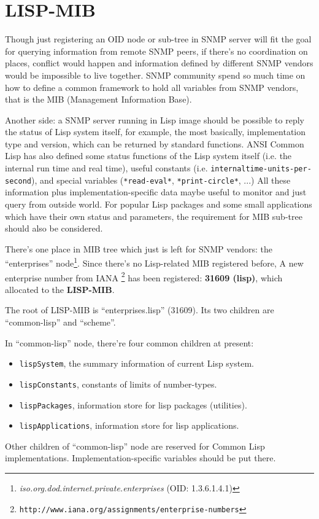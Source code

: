 \documentclass[reprint,natbib,9pt]{sigplanconf}
\begin{document}
\section{LISP-MIB}

Though just registering an OID node or sub-tree in SNMP server will
fit the goal for querying information from remote SNMP peers, if there's
no coordination on places, conflict would happen and information
defined by different SNMP vendors would be impossible to live
together. SNMP community spend so much time on how to define a common
framework to hold all variables from SNMP
vendors, that is the MIB (Management Information Base)\cite{RFC:3418}.

Another side: a SNMP server running in Lisp image should be possible
to reply the status of Lisp system itself, for example, the most
basically, implementation type and version, which can be returned by
standard functions. ANSI Common Lisp has also defined some status
functions of the Lisp system itself (i.e. the internal run time and
real time), useful constants
(i.e. \texttt{internal\-time-\-units-\-per\--second}), and special variables
(\texttt{*read-\-eval*}, \texttt{*print-\-circle*}, ...) All these
information plus implementation-specific data maybe useful to monitor
and just query from outside world. For popular Lisp packages and some
small applications which have their own status and parameters, the
requirement for MIB sub-tree should also be considered.

There's one place in MIB tree which just is left for SNMP vendors: the
``enterprises''
node\footnote{\textsl{iso.org.dod.internet.private.enterprises} (OID:
  1.3.6.1.4.1)}. Since there's no Lisp-related MIB registered before,
A new enterprise number from IANA
\footnote{\texttt{http://www.iana.org/assignments/enterprise-numbers}}
has been registered: \textbf{31609 (lisp)},
which allocated to the \textbf{LISP-MIB}.

The root of LISP-MIB is ``enterprises.lisp'' (31609). Its two children
are ``common-lisp'' and ``scheme''.

In ``common-lisp'' node, there're four common children at present:
\begin{itemize}
\item \texttt{lispSystem}, the summary information of current Lisp
  system.
\item \texttt{lispConstants}, constants of limits of number-types.
\item \texttt{lispPackages}, information store for lisp packages
  (utilities).
\item \texttt{lispApplications}, information store for lisp
  applications.
\end{itemize}
Other children of ``common-lisp'' node are reserved for Common Lisp
implementations.  Implementation-specific variables should be put
there.
\end{document}
